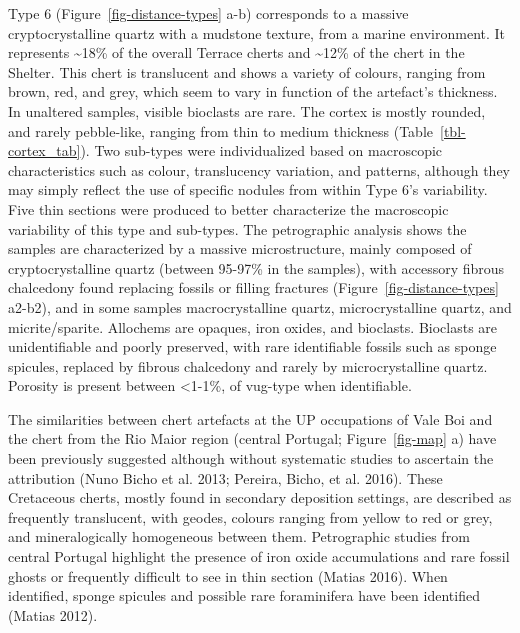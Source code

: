 \documentclass[
  a4paper,
  DIV=11,
  numbers=noendperiod]{scrreprt}
\begin{document}
Type 6 (Figure~\ref{fig-distance-types} a-b) corresponds to a massive
cryptocrystalline quartz with a mudstone texture, from a marine
environment. It represents \textasciitilde18\% of the overall Terrace
cherts and \textasciitilde12\% of the chert in the Shelter. This chert
is translucent and shows a variety of colours, ranging from brown, red,
and grey, which seem to vary in function of the artefact's thickness. In
unaltered samples, visible bioclasts are rare. The cortex is mostly
rounded, and rarely pebble-like, ranging from thin to medium thickness
(Table~\ref{tbl-cortex_tab}). Two sub-types were individualized based on
macroscopic characteristics such as colour, translucency variation, and
patterns, although they may simply reflect the use of specific nodules
from within Type 6's variability. Five thin sections were produced to
better characterize the macroscopic variability of this type and
sub-types. The petrographic analysis shows the samples are characterized
by a massive microstructure, mainly composed of cryptocrystalline quartz
(between 95-97\% in the samples), with accessory fibrous chalcedony
found replacing fossils or filling fractures
(Figure~\ref{fig-distance-types} a2-b2), and in some samples
macrocrystalline quartz, microcrystalline quartz, and micrite/sparite.
Allochems are opaques, iron oxides, and bioclasts. Bioclasts are
unidentifiable and poorly preserved, with rare identifiable fossils such
as sponge spicules, replaced by fibrous chalcedony and rarely by
microcrystalline quartz. Porosity is present between \textless1-1\%, of
vug-type when identifiable.

The similarities between chert artefacts at the UP occupations of Vale
Boi and the chert from the Rio Maior region (central Portugal;
Figure~\ref{fig-map} a) have been previously suggested although without
systematic studies to ascertain the attribution (Nuno Bicho et al. 2013;
Pereira, Bicho, et al. 2016). These Cretaceous cherts, mostly found in
secondary deposition settings, are described as frequently translucent,
with geodes, colours ranging from yellow to red or grey, and
mineralogically homogeneous between them. Petrographic studies from
central Portugal highlight the presence of iron oxide accumulations and
rare fossil ghosts or frequently difficult to see in thin section
(Matias 2016). When identified, sponge spicules and possible rare
foraminifera have been identified (Matias 2012).
\end{document}
